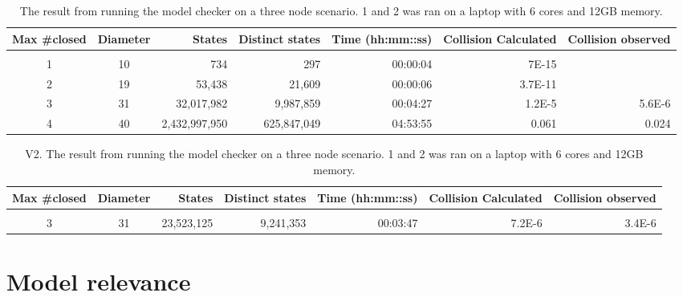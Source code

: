 \documentclass[english, biblatex, digitaloutput]{kththesis}
\begin{document}
\begin{table}[h!]
	\begin{tabular}{c c r r r r r}
		Max \#closed & Diameter & States        & Distinct states & Time (hh:mm::ss) & Collision Calculated & Collision observed \\
		\hline                                                                                                                   \\
		1            & 10       & 734           & 297             & 00:00:04         & 7E-15                &                    \\
		2            & 19       & 53,438        & 21,609          & 00:00:06         & 3.7E-11              &                    \\
		3            & 31       & 32,017,982    & 9,987,859       & 00:04:27         & 1.2E-5               & 5.6E-6             \\
		4            & 40       & 2,432,997,950 & 625,847,049     & 04:53:55         & 0.061                & 0.024              \\
	\end{tabular}
	\caption[Three node model check]{The result from running the model checker on a three node scenario. 1 and 2 was ran on a laptop with 6 cores and 12GB memory.}
\end{table}

\begin{table}[h!]
	\begin{tabular}{c c r r r r r}
		Max \#closed & Diameter & States     & Distinct states & Time (hh:mm::ss) & Collision Calculated & Collision observed \\
		\hline                                                                                                                \\
		3            & 31       & 23,523,125 & 9,241,353       & 00:03:47         & 7.2E-6               & 3.4E-6             \\
	\end{tabular}
	\caption[Three node model check]{V2. The result from running the model checker on a three node scenario. 1 and 2 was ran on a laptop with 6 cores and 12GB memory.}
\end{table}

\section{Model relevance}
\end{document}
